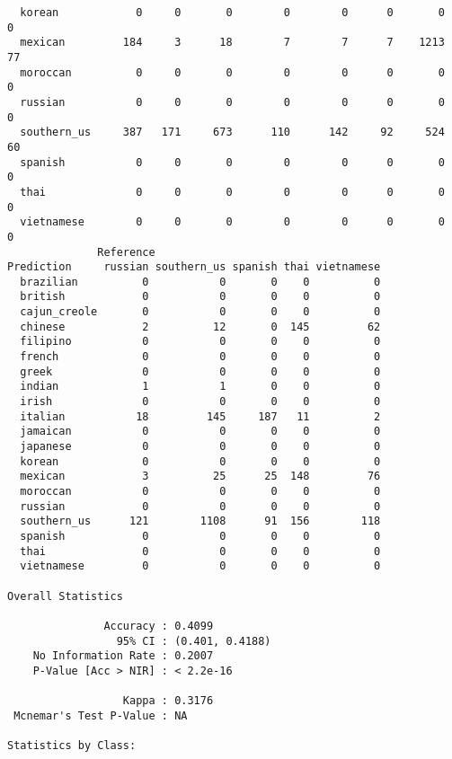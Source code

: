 \documentclass{article}
\begin{document}
\begin{verbatim}
  korean            0     0       0        0        0      0       0        0
  mexican         184     3      18        7        7      7    1213       77
  moroccan          0     0       0        0        0      0       0        0
  russian           0     0       0        0        0      0       0        0
  southern_us     387   171     673      110      142     92     524       60
  spanish           0     0       0        0        0      0       0        0
  thai              0     0       0        0        0      0       0        0
  vietnamese        0     0       0        0        0      0       0        0
              Reference
Prediction     russian southern_us spanish thai vietnamese
  brazilian          0           0       0    0          0
  british            0           0       0    0          0
  cajun_creole       0           0       0    0          0
  chinese            2          12       0  145         62
  filipino           0           0       0    0          0
  french             0           0       0    0          0
  greek              0           0       0    0          0
  indian             1           1       0    0          0
  irish              0           0       0    0          0
  italian           18         145     187   11          2
  jamaican           0           0       0    0          0
  japanese           0           0       0    0          0
  korean             0           0       0    0          0
  mexican            3          25      25  148         76
  moroccan           0           0       0    0          0
  russian            0           0       0    0          0
  southern_us      121        1108      91  156        118
  spanish            0           0       0    0          0
  thai               0           0       0    0          0
  vietnamese         0           0       0    0          0

Overall Statistics
                                         
               Accuracy : 0.4099         
                 95% CI : (0.401, 0.4188)
    No Information Rate : 0.2007         
    P-Value [Acc > NIR] : < 2.2e-16      
                                         
                  Kappa : 0.3176         
 Mcnemar's Test P-Value : NA             

Statistics by Class:


\end{verbatim}
\end{document}
